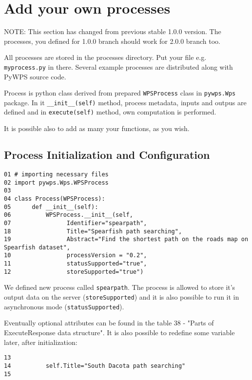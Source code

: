 \documentclass[a4paper,11pt]{article}
\newcommand{\note}[1]{\medskip{}\noindent{}NOTE: #1\medskip{}}
\begin{document}
\section{Add your own processes}
\note{This section has changed from previous stable 1.0.0 version. The
processes, you defined for 1.0.0 branch should work for 2.0.0 branch too.}
    
All processes are stored in the processes directory. Put your file
e.g. \texttt{myprocess.py} in there. Several example processes are
distributed along with PyWPS source code.
    
Process is python class derived from prepared \texttt{WPSProcess} class in
\texttt{pywps.Wps} package. In it \texttt{\_\_init\_\_(self)} method,
process metadata, inputs and outpus are defined and in
\texttt{execute(self)} method, own computation is performed.

It is possible also to add as many your functions, as you wish.
    

\subsection{Process Initialization and Configuration}
    

\begin{verbatim}
01 # importing necessary files
02 import pywps.Wps.WPSProcess
03 
04 class Process(WPSProcess):
05      def __init__(self):
06          WPSProcess.__init__(self,
07                Identifier="spearpath",
18                Title="Spearfish path searching",
19                Abstract="Find the shortest path on the roads map on Spearfish dataset",
10                processVersion = "0.2",
11                statusSupported="true",
12                storeSupported="true")
\end{verbatim}

We defined new process called \texttt{spearpath}. The process is allowed to
store it's output data on the server (\texttt{storeSupported}) and it is also possible to run it in
asynchronous mode (\texttt{statusSupported}).
     
Eventually optional attributes can be found in the table 38 - "Parts of
ExecuteResponse data structure". It is also possible to redefine some
variable later, after initialization:

\begin{verbatim}
13
14          self.Title="South Dacota path searching"
15
\end{verbatim}
\end{document}
